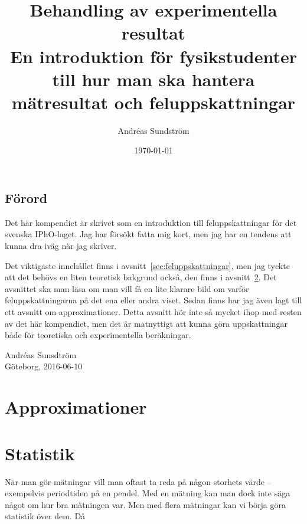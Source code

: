 \documentclass[11pt,a4paper, english, swedish
]{article}
\begin{document}

\title{ Behandling av experimentella resultat\\ 
\Large En introduktion för fysikstudenter till hur man ska hantera
mätresultat och feluppskattningar}
\author{Andréas Sundström}
\date{\today}

\maketitle


\subsection*{Förord}
\small
Det här kompendiet är skrivet som en introduktion till
feluppskattningar för det svenska IPhO-laget. Jag har försökt fatta
mig kort, men jag har en tendens att kunna dra iväg när jag
skriver. 

Det viktigaste innehållet finns i avsnitt~\ref{sec:feluppskattningar},
men jag tyckte att det behövs en liten teoretisk bakgrund också, den
finns i avsnitt~\ref{sec:statistik}. Det avsnittet ska man läsa om man
vill få en lite klarare bild om varför feluppskattningarna på det ena
eller andra viset. Sedan finns har jag även lagt till ett avsnitt om
approximationer. Detta avsnitt hör inte så mycket ihop med resten av
det här kompendiet, men det är matnyttigt att kunna göra
uppskattningar både för teoretiska och experimentella beräkningar. 
\begin{flushright}
Andréas Sunsdtröm\\ Göteborg, 2016-06-10
\end{flushright}
\normalsize

\addtocounter{section}{-1}
\section{Approximationer}


\section{Statistik}\label{sec:statistik}
När man gör mätningar vill man oftast ta reda på någon storhets värde
-- exempelvis periodtiden på en pendel. Med en mätning kan man dock
inte säga något om hur bra mätningen var. Men med flera mätningar kan
vi börja göra statistik över dem. Då 
\end{document}
